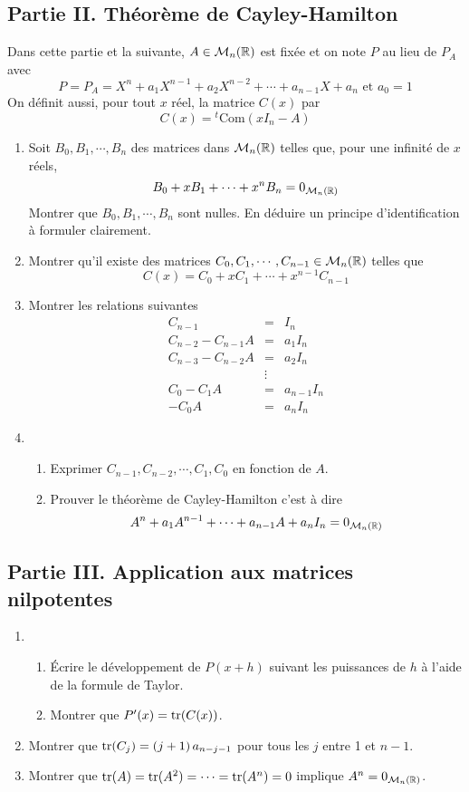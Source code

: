 \subsection*{Partie II. Th{\'e}or{\`e}me de Cayley-Hamilton}
Dans cette partie et la suivante, $A\in \mathcal{M}_{n}(\mathbb{R})$ est fixée et on note $P$ au lieu de $P_{A}$ avec
\begin{displaymath}
P = P_A = X^{n}+a_{1}X^{n-1}+a_{2}X^{n-2}+\cdots+a_{n-1}X+a_{n}  \text{ et } a_0 = 1  
\end{displaymath}
On d{\'e}finit aussi, pour tout $x$ r{\'e}el, la matrice $C(x)$ par
\[C(x)= \phantom{ }^{t}\mathrm{Com}(xI_{n}-A)\]
\begin{enumerate}
\item Soit $B_{0},B_{1},\cdots, B_{n}$ des matrices dans $\mathcal{M}_{n}(\mathbb{R})$ telles que, pour une infinit{\'e} de $x$ r{\'e}els,
\[B_{0}+xB_{1}+\cdots+x^{n}B_{n}=0_{\mathcal{M}_{n}(\mathbb{R})}\]
Montrer que $ B_{0},B_{1},\cdots, B_{n}$ sont nulles. En d{\'e}duire un principe d'identification {\`a} formuler clairement.
\item Montrer qu'il existe des matrices $ C_{0},C_{1},\cdots, C_{n-1}\in \mathcal{M}_{n}(\mathbb{R})$ telles que
\[C(x)= C_{0}+xC_{1}+\cdots+x^{n-1} C_{n-1}\]
\item Montrer les relations suivantes
\begin{eqnarray*}
C_{n-1}&=&I_{n}\\
C_{n-2}-C_{n-1}A &=& a_{1}I_{n}\\
C_{n-3}-C_{n-2}A &=& a_{2}I_{n}\\
&\vdots&\\
C_{0}-C_{1}A &=& a_{n-1}I_{n}\\
-C_{0}A &=& a_{n}I_{n}
\end{eqnarray*}
\item \begin{enumerate}
\item Exprimer $ C_{n-1},C_{n-2},\cdots, C_{1}, C_0$ en fonction de $A$.
\item Prouver le th{\'e}or{\`e}me de Cayley-Hamilton c'est {\`a} dire
\[A^{n}+a_{1}A^{n-1}+\cdots+a_{n-1}A+a_{n}I_{n}=0_{\mathcal{M}_{n}(\mathbb{R})}\]
\end{enumerate}
\end{enumerate}
\subsection*{Partie III. Application aux matrices nilpotentes}
\begin{enumerate}
\item \begin{enumerate}
\item {\'E}crire le d{\'e}veloppement de $P(x+h)$ suivant les puissances de $h$ {\`a} l'aide de la formule de Taylor.
\item Montrer que $P'(x)=\operatorname{tr} (C(x))$.
\end{enumerate}
\item Montrer que $\operatorname{tr}(C_{j}) = (j+1)\,a_{n-j-1}$ pour tous les $j$ entre 1 et $n-1$.
\item Montrer que $\operatorname{tr}(A)=\operatorname{tr}(A^{2})=\cdots=\operatorname{tr}(A^{n})=0$ implique  $A^{n}=0_{\mathcal{M}_{n}(\mathbb{R})}$.
\end{enumerate}
